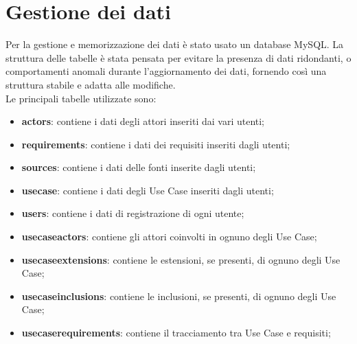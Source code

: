 \section{Gestione dei dati}
Per la gestione e memorizzazione dei dati è stato usato un database MySQL. La struttura delle tabelle è stata pensata per evitare la presenza di dati ridondanti, o comportamenti anomali durante l’aggiornamento dei dati, fornendo così una struttura stabile e adatta alle modifiche. \\
Le principali tabelle utilizzate sono:
\begin{itemize}
	\item \textbf{actors}: contiene i dati degli attori inseriti dai vari utenti;
	\item \textbf{requirements}: contiene i dati dei requisiti inseriti dagli utenti;
	\item \textbf{sources}: contiene i dati delle fonti inserite dagli utenti;
	\item \textbf{usecase}: contiene i dati degli Use Case inseriti dagli utenti;
	\item \textbf{users}: contiene i dati di registrazione di ogni utente;
	\item \textbf{usecaseactors}: contiene gli attori coinvolti in ognuno degli Use Case;
	\item \textbf{usecaseextensions}: contiene le estensioni, se presenti, di ognuno degli Use Case;
	\item \textbf{usecaseinclusions}: contiene le inclusioni, se presenti, di ognuno degli Use Case;
	\item \textbf{usecaserequirements}: contiene il tracciamento tra Use Case e requisiti;
\end{itemize}  